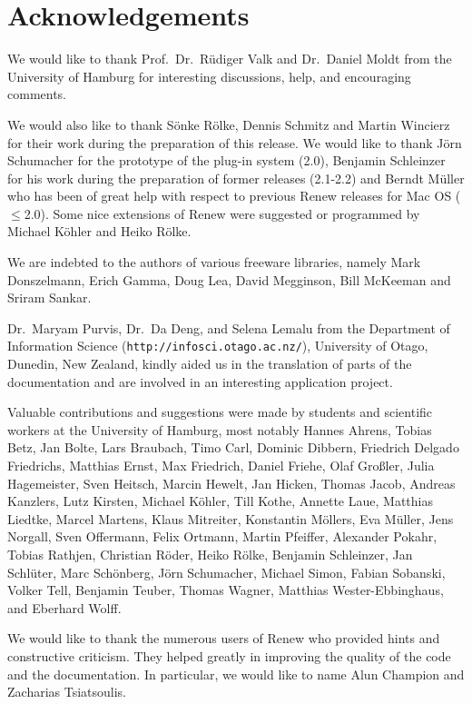\section{Acknowledgements}
We would like to thank Prof.\ Dr.\ R\"udiger Valk and Dr.\ Daniel Moldt
from the University of Hamburg for interesting discussions, help, 
and encouraging comments. 

We would also like to thank 
S\"onke R\"olke,
Dennis Schmitz and
Martin Wincierz
for their work during the preparation of this
release.
We would like to thank J\"orn Schumacher
for the prototype of the plug-in system (2.0), Benjamin Schleinzer
for his work during the preparation of former releases (2.1-2.2) and 
Berndt M\"uller who %
has been of great help with respect to previous
Renew releases for Mac OS ($\leq{}$2.0).
Some nice extensions of Renew were suggested or programmed
by Michael K\"oh\-ler and Heiko R\"olke.

We are indebted to the authors of various freeware libraries, namely
Mark Donszelmann, %
Erich Gamma, %
Doug Lea, %
David Megginson, %
Bill McKeeman %
and Sriram Sankar. %

Dr.\ Maryam Purvis, Dr.\ Da Deng, and Selena Lemalu 
from the Department of Information Science
(\texttt{http://infosci.otago.ac.nz/}), University of
Otago, Dunedin, New Zealand,
kindly aided us in the translation of parts of the documentation
and are involved in an interesting application project.

Valuable contributions and suggestions were made by
students and scientific workers at the University of Hamburg, most notably
Hannes Ahrens,
Tobias Betz, 
Jan Bolte,
Lars Braubach,
Timo Carl,
Dominic Dibbern,
Friedrich Delgado Friedrichs,
Matthias Ernst, 
Max Friedrich,
Daniel Friehe,
Olaf Gro\ss ler, 
Julia Hagemeister,
Sven Heitsch,
Marcin Hewelt,
Jan Hicken,
Thomas Jacob, 
Andreas Kanzlers,
Lutz Kirsten,
Michael K\"oh\-ler, 
Till Kothe,
Annette Laue, 
Matthias Liedtke, 
Marcel Martens, 
Klaus Mit\-rei\-ter,
Konstantin M\"ollers,
Eva M\"uller,
Jens Nor\-gall,
Sven Offermann,
Felix Ortmann,
Martin Pfeiffer, 
Alexander Pokahr,
Tobias Rathjen,
Christian R\"oder,
Heiko R\"olke, 
Benjamin Schleinzer,
Jan Schl\"uter,
Marc Sch\"on\-berg,
J\"orn Schumacher,
Michael Simon,
Fabian Sobanski, 
Volker Tell,
Benjamin Teuber,
Thomas Wagner,
Matthias Wester-Ebbinghaus, 
and Eberhard Wolff. 



We would like to thank the numerous users of Renew who provided
hints and constructive criticism. They helped greatly in improving the
quality of the code and the documentation. In particular, 
we would like to name Alun Champion and Zacharias Tsiatsoulis.

